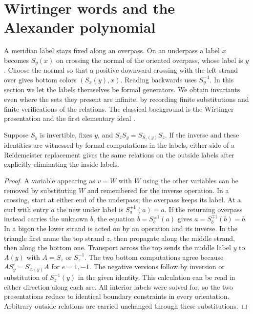 \section{Wirtinger words and the Alexander polynomial}
\label{sec:alex}
A meridian label stays fixed along an overpass. On an underpass a label $x$ becomes $S_y(x)$ on crossing the normal of the oriented overpass, whose label is $y$. Choose the normal so that a positive downward crossing with the left strand over gives bottom colors $(S_x(y),x)$. Reading backwards uses $S_y^{-1}$. In this section we let the labels themselves be formal generators. We obtain invariants even where the sets they present are infinite, by recording finite substitutions and finite verifications of the relations. The classical background is the Wirtinger presentation and the first elementary ideal \cite{alexander,hiller,colorknots}.

\begin{lemma}\label{lem:eliminate}
Suppose $S_y$ is invertible, fixes $y$, and $S_z S_y=S_{S_z(y)}S_z$. If the inverse and these identities are witnessed by formal computations in the labels, either side of a Reidemeister replacement gives the same relations on the outside labels after explicitly eliminating the inside labels.
\end{lemma}
\begin{proof}
A variable appearing as $v=W$ with $W$ using the other variables can be removed by substituting $W$ and remembered for the inverse operation. In a crossing, start at either end of the underpass; the overpass keeps its label. At a curl with entry $a$ the new under label is $S_a^{\pm1}(a)=a$. If the returning overpass instead carries the unknown $b$, the equation $b=S_b^{\pm1}(a)$ gives $a=S_b^{\mp1}(b)=b$. In a bigon the lower strand is acted on by an operation and its inverse. In the triangle first name the top strand $z$, then propagate along the middle strand, then along the bottom one. Transport across the top sends the middle label $y$ to $A(y)$ with $A=S_z$ or $S_z^{-1}$. The two bottom computations agree because $A S_y^e=S_{A(y)}^e A$ for $e=1,-1$. The negative versions follow by inversion or substitution of $S_z^{-1}(y)$ in the given identity. This calculation can be read in either direction along each arc. All interior labels were solved for, so the two presentations reduce to identical boundary constraints in every orientation. Arbitrary outside relations are carried unchanged through these substitutions.
\end{proof}

